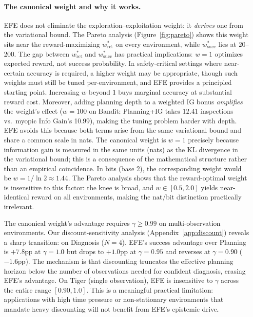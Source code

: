 \documentclass[runningheads]{llncs}
\begin{document}
\paragraph{The canonical weight and why it works.}
EFE does not eliminate the exploration--exploitation weight; it \emph{derives} one from the variational bound. The Pareto analysis (Figure~\ref{fig:pareto}) shows this weight sits near the reward-maximizing $w^*_{\text{ret}}$ on every environment, while $w^*_{\text{succ}}$ lies at $20$--$200$. The gap between $w^*_{\text{ret}}$ and $w^*_{\text{succ}}$ has practical implications: $w{=}1$ optimizes expected reward, not success probability. In safety-critical settings where near-certain accuracy is required, a higher weight may be appropriate, though such weights must still be tuned per-environment, and EFE provides a principled starting point. Increasing $w$ beyond 1 buys marginal accuracy at substantial reward cost. Moreover, adding planning depth to a weighted IG bonus \emph{amplifies} the weight's effect ($w{=}100$ on Bandit: Planning+IG takes 12.41 inspections vs.\ myopic Info Gain's 10.99), making the tuning problem harder with depth. EFE avoids this because both terms arise from the same variational bound and share a common scale in nats. The canonical weight is $w{=}1$ precisely because information gain is measured in the same units (nats) as the KL divergence in the variational bound; this is a consequence of the mathematical structure rather than an empirical coincidence. In bits (base 2), the corresponding weight would be $w = 1/\ln 2 \approx 1.44$. The Pareto analysis shows that the reward-optimal weight is insensitive to this factor: the knee is broad, and $w \in [0.5, 2.0]$ yields near-identical reward on all environments, making the nat/bit distinction practically irrelevant.

The canonical weight's advantage requires $\gamma \geq 0.99$ on multi-observation environments. Our discount-sensitivity analysis (Appendix~\ref{app:discount}) reveals a sharp transition: on Diagnosis ($N{=}4$), EFE's success advantage over Planning is $+7.8$pp at $\gamma{=}1.0$ but drops to $+1.0$pp at $\gamma{=}0.95$ and reverses at $\gamma{=}0.90$ ($-1.6$pp). The mechanism is that discounting truncates the effective planning horizon below the number of observations needed for confident diagnosis, erasing EFE's advantage. On Tiger (single observation), EFE is insensitive to $\gamma$ across the entire range $[0.90, 1.0]$. This is a meaningful practical limitation: applications with high time pressure or non-stationary environments that mandate heavy discounting will not benefit from EFE's epistemic drive.
\end{document}
